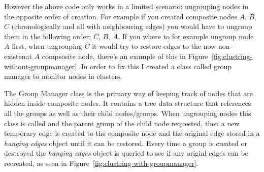 However the above code only works in a limited scenario: ungrouping nodes in the opposite order of creation. For example if you created composite nodes $A$, $B$, $C$ (chronologically and all with neighbouring edges) you would have to ungroup them in the following order: $C$, $B$, $A$. If you where to for example ungroup node $A$ first, when ungrouping $C$ it would try to restore edges to the now non-existenat $A$ compsosite node, there's an example of this in Figure~\ref{fig:clustring-without-groupmanager}. In order to fix this I created a class called group manager to monitor nodes in clusters.

The Group Manager class is the primary way of keeping track of nodes that are hidden inside composite nodes. It contains a tree data structure that references all the groups as well as their child nodes/groups. When ungrouping nodes this class is called and the parent group of the child node requested, then a new temporary edge is created to the composite node and the original edge stored in a \textit{hanging edges} object until it can be restored. Every time a group is created or destroyed the \textit{hanging edges} object is queried to see if any originl edges can be recreated, as seen in Figure~\ref{fig:clustring-with-groupmanager}.

